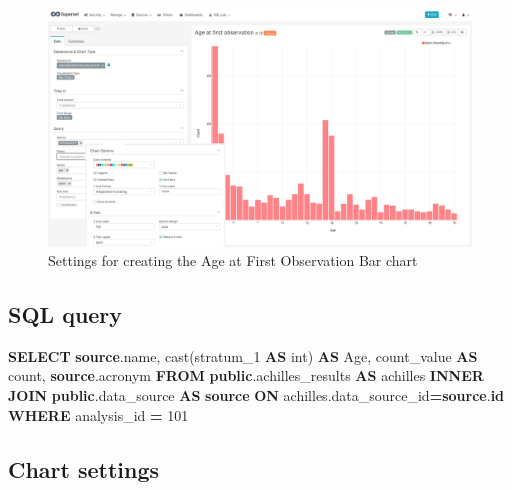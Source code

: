 \documentclass[
]{book}
\newenvironment{Shaded}{\begin{snugshade}}{\end{snugshade}}
\newcommand{\DataTypeTok}[1]{\textcolor[rgb]{0.13,0.29,0.53}{#1}}
\newcommand{\DecValTok}[1]{\textcolor[rgb]{0.00,0.00,0.81}{#1}}
\newcommand{\FunctionTok}[1]{\textcolor[rgb]{0.00,0.00,0.00}{#1}}
\newcommand{\KeywordTok}[1]{\textcolor[rgb]{0.13,0.29,0.53}{\textbf{#1}}}
\newcommand{\NormalTok}[1]{#1}
\newcommand{\OperatorTok}[1]{\textcolor[rgb]{0.81,0.36,0.00}{\textbf{#1}}}
\begin{document}
\begin{figure}
\includegraphics[width=1\linewidth]{images/04-person/03-age_at_first_observation_bar} \caption{Settings for creating the Age at First Observation Bar chart}\label{fig:ageFirstObservationBar}
\end{figure}

\hypertarget{sql-query-9}{%
\subsection{SQL query}\label{sql-query-9}}

\begin{Shaded}
\begin{Highlighting}[]
\KeywordTok{SELECT} \KeywordTok{source}\NormalTok{.name,}
    \FunctionTok{cast}\NormalTok{(stratum\_1 }\KeywordTok{AS} \DataTypeTok{int}\NormalTok{) }\KeywordTok{AS}\NormalTok{ Age,}
\NormalTok{    count\_value }\KeywordTok{AS} \FunctionTok{count}\NormalTok{, }
    \KeywordTok{source}\NormalTok{.acronym}
\KeywordTok{FROM} \KeywordTok{public}\NormalTok{.achilles\_results }\KeywordTok{AS}\NormalTok{ achilles}
\KeywordTok{INNER} \KeywordTok{JOIN} \KeywordTok{public}\NormalTok{.data\_source }\KeywordTok{AS} \KeywordTok{source} \KeywordTok{ON}\NormalTok{ achilles.data\_source\_id}\OperatorTok{=}\KeywordTok{source}\NormalTok{.}\KeywordTok{id}
\KeywordTok{WHERE}\NormalTok{ analysis\_id }\OperatorTok{=} \DecValTok{101}
\end{Highlighting}
\end{Shaded}

\hypertarget{chart-settings-9}{%
\subsection{Chart settings}\label{chart-settings-9}}
\end{document}
